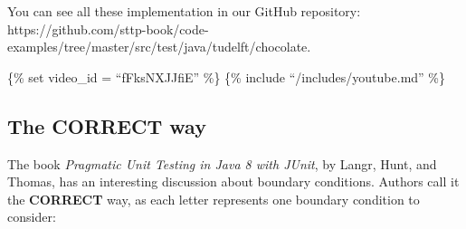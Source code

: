 \begin{Shaded}
\begin{Highlighting}[]
\NormalTok{(}\NormalTok{,}\NormalTok{,}\NormalTok{,}\NormalTok{),}
\NormalTok{(}\NormalTok{,}\NormalTok{,}\NormalTok{,}\NormalTok{),}
\NormalTok{(}\NormalTok{,}\NormalTok{,}\NormalTok{,}\NormalTok{),}
\NormalTok{(}\NormalTok{,}\NormalTok{,}\NormalTok{,}\NormalTok{),}
\NormalTok{(}\NormalTok{,}\NormalTok{,}\NormalTok{,{-}}\NormalTok{),}
\NormalTok{(}\NormalTok{,}\NormalTok{,}\NormalTok{,{-}}\NormalTok{)}
\NormalTok{      );}

\NormalTok{    \}}
\NormalTok{\}}
\end{Highlighting}
\end{Shaded}

You can see all these implementation in our GitHub repository:
https://github.com/sttp-book/code-examples/tree/master/src/test/java/tudelft/chocolate.

\{\% set video\_id = ``fFksNXJJfiE'' \%\} \{\% include
``/includes/youtube.md'' \%\}

\hypertarget{the-correct-way}{%
\subsection{The CORRECT way}\label{the-correct-way}}

The book \emph{Pragmatic Unit Testing in Java 8 with JUnit}, by Langr,
Hunt, and Thomas, has an interesting discussion about boundary
conditions. Authors call it the \textbf{CORRECT} way, as each letter
represents one boundary condition to consider:

